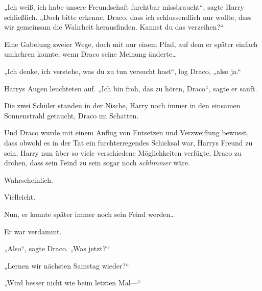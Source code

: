 „Ich weiß, ich habe unsere Freundschaft furchtbar missbraucht“, sagte Harry schließlich. „Doch bitte erkenne, Draco, dass ich schlussendlich nur wollte, dass wir gemeinsam die Wahrheit herausfinden. Kannst du das verzeihen?“

Eine Gabelung zweier Wege, doch mit nur einem Pfad, auf dem er später einfach umkehren konnte, wenn Draco seine Meinung änderte…

„Ich denke, ich verstehe, was du zu tun versucht hast“, log Draco, „also ja.“

Harrys Augen leuchteten auf. „Ich bin froh, das zu hören, Draco“, sagte er sanft.

Die zwei Schüler standen in der Nische, Harry noch immer in den einsamen Sonnenstrahl getaucht, Draco im Schatten.

Und Draco wurde mit einem Anflug von Entsetzen und Verzweiflung bewusst, dass obwohl es in der Tat ein furchterregendes Schicksal war, Harrys Freund zu sein, Harry nun über so viele verschiedene Möglichkeiten verfügte, Draco zu drohen, dass sein Feind zu sein sogar noch \emph{schlimmer} wäre.

Wahrscheinlich.

Vielleicht.

Nun, er konnte später immer noch sein Feind werden…

Er war verdammt.

„Also“, sagte Draco. „Was jetzt?“

„Lernen wir nächsten Samstag wieder?“

„Wird besser nicht wie beim letzten Mal—“

